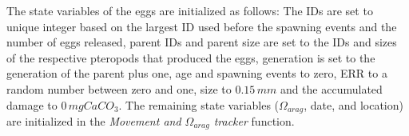 The state variables of the eggs are initialized as follows: The IDs are set to unique integer based on the largest ID used before the spawning events and the number of eggs released, parent IDs and parent size are set to the IDs and sizes of the respective pteropods that produced the eggs, generation is set to the generation of the parent plus one, age and spawning events to zero, ERR to a random number between zero and one, size to $0.15\, mm$ \citep{Wang2017Lifecycle} and the accumulated damage to $0 \, mg CaCO_3$. The remaining state variables ($\Omega_{arag}$, date, and location) are initialized in the \textit{Movement and $\Omega_{arag}$ tracker} function.













